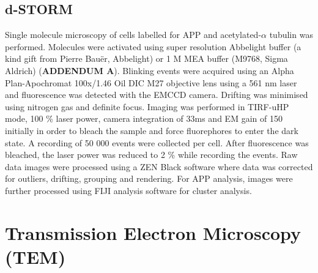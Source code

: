 \subsection{d-STORM}
Single molecule microscopy of cells labelled for APP and acetylated-$\alpha$ tubulin was performed. Molecules were activated using super resolution Abbelight buffer (a kind gift from Pierre Bauër, Abbelight) or 1 M MEA buffer (M9768, Sigma Aldrich) (\textbf{ADDENDUM A}). Blinking events were acquired using an Alpha Plan-Apochromat 100x/1.46 Oil DIC M27 objective lens using a 561 nm laser and fluorescence was detected with the EMCCD camera. Drifting was minimised using nitrogen gas and definite focus. Imaging was performed in TIRF-uHP mode, 100 \% laser power, camera integration of 33ms and EM gain of 150 initially in order to bleach the sample and force fluorephores to enter the dark state. A recording of 50 000 events were collected per cell. After fluorescence was bleached, the laser power was reduced to 2 \% while recording the events. Raw data images were processed using a ZEN Black software where data was corrected for outliers, drifting, grouping and rendering. For APP analysis, images were further processed using FIJI analysis software for cluster analysis. 

\section{Transmission Electron Microscopy (TEM)}
